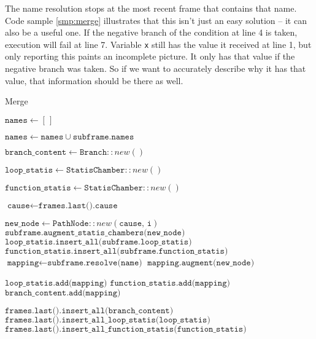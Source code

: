\documentclass[a4paper, 16pt, oneside]{Thesis}
\begin{document}
The name resolution stops at the most recent frame that contains that
name. Code sample \ref{smp:merge} illustrates that this isn't just an
easy solution -- it can also be a useful one. If the negative branch of
the condition at line 4 is taken, execution will fail at line 7.
Variable \texttt{x} still has the value it received at line 1, but only
reporting this paints an incomplete picture. It only has that value if
the negative branch was taken. So if we want to accurately describe why
it has that value, that information should be there as well.

\begin{algorithm}
    \caption{Merge}\label{alg:merge}
    \begin{algorithmic}[1]
         {}
          \State $\texttt{names} \gets [\,]$

            \State $\texttt{names} \gets \texttt{names} \cup \texttt{subframe.names}$
          \EndFor

          \State $\texttt{branch\_content} \gets \texttt{Branch}::new()$

          \State $\texttt{loop\_statis} \gets \texttt{StatisChamber}::new()$

          \State $\texttt{function\_statis} \gets \texttt{StatisChamber}::new()$

          \State $\texttt{cause} \gets \texttt{frames.last().cause}$

            \State $\texttt{new\_node} \gets \texttt{PathNode}::new(\texttt{cause, i})$
            \State $\texttt{subframe.augment\_statis\_chambers(new\_node)}$
            \State $\texttt{loop\_statis.insert\_all(subframe.loop\_statis)}$
            \State $\texttt{function\_statis.insert\_all(subframe.function\_statis)}$
              \State $\texttt{mapping} \gets \texttt{subframe.resolve(name)}$
              \State $\texttt{mapping.augment(new\_node)}$

                  \State $\texttt{loop\_statis.add(mapping)}$
              \Else 
                    \State $\texttt{function\_statis.add(mapping)}$
                \Else 
                    \State $\texttt{branch\_content.add(mapping)}$
                \EndIf
              \EndIf
            \EndFor
          \EndFor

          \State $\texttt{frames.last().insert\_all(branch\_content)}$
          \State $\texttt{frames.last().insert\_all\_loop\_statis(loop\_statis)}$
          \State $\texttt{frames.last().insert\_all\_function\_statis(function\_statis)}$
        \EndFunction
    \end{algorithmic}
\end{algorithm}
\end{document}
